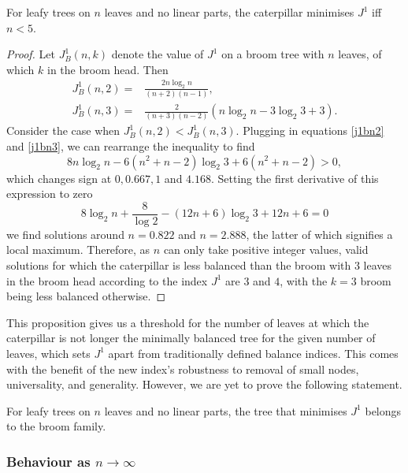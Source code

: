 \begin{proposition}\label{cat_prop}
    For leafy trees on $n$ leaves and no linear parts, the caterpillar minimises $J^1$ iff $n<5$.
\end{proposition}
\begin{proof}
    Let $J^1_B(n,k)$ denote the value of $J^1$ on a broom tree with $n$ leaves, of which $k$ in the broom head. Then
    \begin{align}
        J^1_B(n,2) = & \frac{2n\log_2n}{(n+2)(n-1)}, \label{j1bn2}\\
        J^1_B(n,3) = & \frac{2}{(n+3)(n-2)}(n\log_2n - 3\log_2 3 + 3).\label{j1bn3}
    \end{align}
    Consider the case when $J^1_B(n,2) < J^1_B(n,3)$. Plugging in equations \eqref{j1bn2} and \eqref{j1bn3}, we can rearrange the inequality to find
    \begin{equation}
        8n\log_2n - 6(n^2+n-2)\log_2 3 + 6(n^2+n-2) > 0,
    \end{equation}
    which changes sign at $0, 0.667, 1$ and $4.168$. Setting the first derivative of this expression to zero
    \begin{equation*}
        8\log_2n+\frac{8}{\log 2}-(12n+6)\log_2 3 + 12n + 6 = 0
    \end{equation*}
    we find solutions around $n=0.822$ and $n=2.888$, the latter of which signifies a local maximum. Therefore, as $n$ can only take positive integer values, valid solutions for which the caterpillar is less balanced than the broom with $3$ leaves in the broom head according to the index $J^1$ are $3$ and $4$, with the $k=3$ broom being less balanced otherwise.
\end{proof}

This proposition gives us a threshold for the number of leaves at which the caterpillar is not longer the minimally balanced tree for the given number of leaves, which sets $J^1$ apart from traditionally defined balance indices. This comes with the benefit of the new index's robustness to removal of small nodes, universality, and generality. However, we are yet to prove the following statement.

\begin{conjecture}\label{conj}
    For leafy trees on $n$ leaves and no linear parts, the tree that minimises $J^1$ belongs to the broom family.
\end{conjecture}

\subsubsection{Behaviour as $n\to\infty$}

